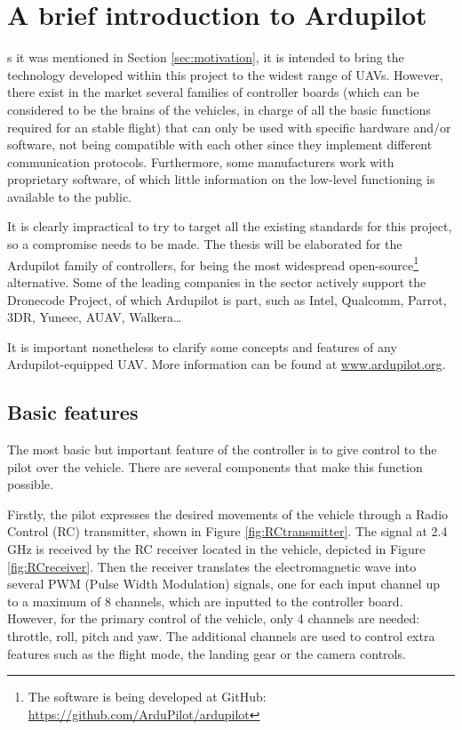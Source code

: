 
\let\textcircled=\pgftextcircled
\chapter{A brief introduction to Ardupilot}

s it was mentioned in Section \ref{sec:motivation}, it is intended to bring the technology developed within this project to the widest range of UAVs.
However, there exist in the market several families of controller boards (which can be considered to be the brains of the vehicles, in charge of all the basic functions required for an stable flight) that can only be used with specific hardware and/or software, not being compatible with each other since they implement different communication protocols.
Furthermore, some manufacturers work with proprietary software, of which little information on the low-level functioning is available to the public.

It is clearly impractical to try to target all the existing standards for this project, so a compromise needs to be made.
The thesis will be elaborated for the Ardupilot family of controllers, for being the most widespread open-source\footnote{The software is being developed at GitHub: \url{https://github.com/ArduPilot/ardupilot}} alternative.
Some of the leading companies \cite{droneindustryinsights2016} in the sector actively support the Dronecode Project, of which Ardupilot is part, such as Intel, Qualcomm, Parrot, 3DR, Yuneec, AUAV, Walkera\ldots \cite{dronecode2016}

It is important nonetheless to clarify some concepts and features of any Ardupilot-equipped UAV.
More information can be found at \url{www.ardupilot.org}.

\section{Basic features}

The most basic but important feature of the controller is to give control to the pilot over the vehicle.
There are several components that make this function possible.

Firstly, the pilot expresses the desired movements of the vehicle through a Radio Control (RC) transmitter, shown in Figure \ref{fig:RCtransmitter}.
The signal at 2.4 GHz is received by the RC receiver located in the vehicle, depicted in Figure \ref{fig:RCreceiver}.
Then the receiver translates the electromagnetic wave into several PWM (Pulse Width Modulation) signals, one for each input channel up to a maximum of 8 channels, which are inputted to the controller board.
However, for the primary control of the vehicle, only 4 channels are needed: throttle, roll, pitch and yaw.
The additional channels are used to control extra features such as the flight mode, the landing gear or the camera controls.


